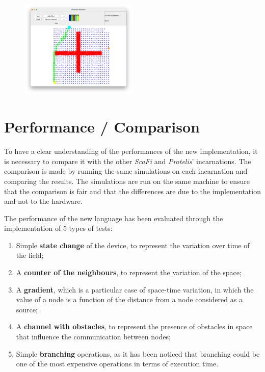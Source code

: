 \begin{figure}[ht!]
    \centering
    \includegraphics[width=0.5\textwidth]{figures/channel3}
    \caption{}
    \label{fig:channel3}
\end{figure}

\section{Performance / Comparison}
\label{sec:performance-/-comparison}
To have a clear understanding of the performances of the new implementation, it is necessary to compare it with the other
\emph{ScaFi} and \emph{Protelis}' incarnations.
The comparison is made by running the same simulations on each incarnation and comparing the results.
The simulations are run on the same machine to ensure that the comparison is fair and that the differences are due to the
implementation and not to the hardware.

The performance of the new language has been evaluated through the implementation of 5 types of tests:
\begin{enumerate}
    \item Simple \textbf{state change} of the device, to represent the variation over time of the field;
    \item A \textbf{counter of the neighbours}, to represent the variation of the space;
    \item A \textbf{gradient}, which is a particular case of space-time variation, in which the value of a node is a
        function of the distance from a node considered as a source;
    \item A \textbf{channel with obstacles}, to represent the presence of obstacles in space that influence the communication between nodes;
    \item Simple \textbf{branching} operations, as it has been noticed that branching could be one of the most expensive operations in terms of execution time.
\end{enumerate}

